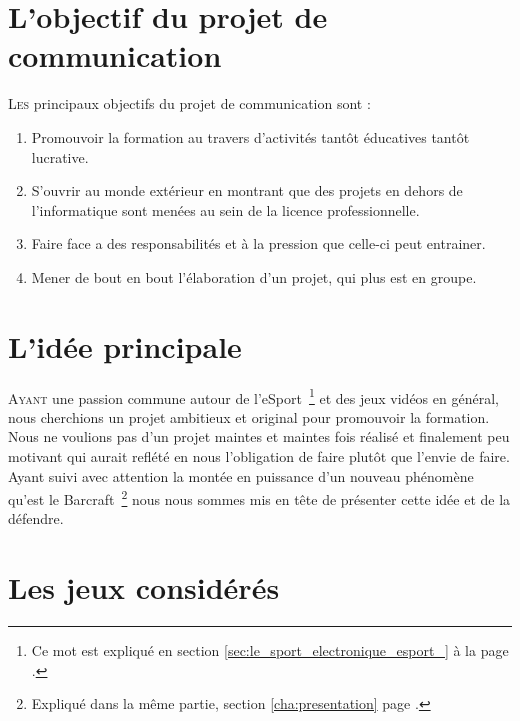 \section{L'objectif du projet de communication}%
\label{sec:l_objectif_du_projet_de_communication}

\lettrine{L}{es} principaux objectifs du projet de communication sont :\\

\begin{enumerate}

\item Promouvoir la formation au travers d'activités tantôt éducatives
tantôt lucrative.

\item S'ouvrir au monde extérieur en montrant que des projets en dehors
de l'informatique sont menées au sein de la licence professionnelle.

\item Faire face a des responsabilités et à la pression que celle-ci
peut entrainer.

\item Mener de bout en bout l'élaboration d'un projet, qui plus est en
groupe.

\end{enumerate}

\section{L'idée principale}
\label{sec:l_idee_principale}

\lettrine{A}{yant} une passion commune autour de l'eSport\, \footnote{Ce
mot est expliqué en section \ref{sec:le_sport_electronique_esport_} à la
page \pageref{sec:le_sport_electronique_esport_}.} et des jeux vidéos en
général, nous cherchions un projet ambitieux et original pour promouvoir
la formation.  Nous ne voulions pas d'un projet maintes et maintes fois
réalisé et finalement peu motivant qui aurait reflété en nous
l'obligation de faire plutôt que l'envie de faire.  Ayant suivi avec
attention la montée en puissance d'un nouveau phénomène qu'est le
Barcraft\, \footnote{Expliqué dans la même partie, section
\ref{cha:presentation} page \pageref{sec:barcraft}.} nous nous sommes
mis en tête de présenter cette idée et de la défendre.

\section{Les jeux considérés}%
\label{sec:les_jeux_consideres}

